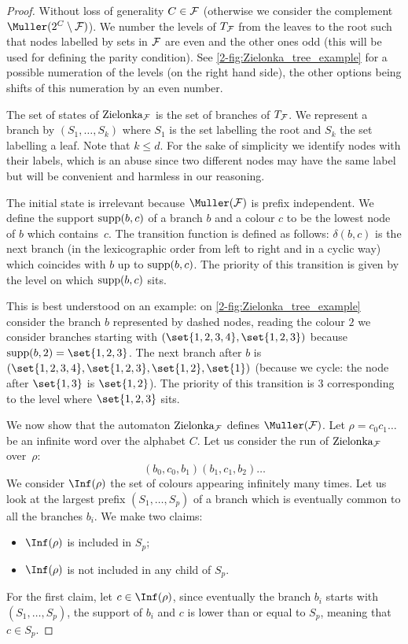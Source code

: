 \begin{proof}
Without loss of generality $C \in \mathcal{F}$ (otherwise we consider the complement $\Muller(2^C \setminus \F)$).
We number the levels of $T_{\mathcal{F}}$ from the leaves to the root such that nodes labelled by sets in $\mathcal{F}$ are even
and the other ones odd (this will be used for defining the parity condition).
See \cref{2-fig:Zielonka_tree_example} for a possible numeration of the levels (on the right hand side), the other options being shifts of this numeration by an even number.

The set of states of $\mathrm{Zielonka}_{\mathcal{F}}$ is the set of branches of $T_{\mathcal{F}}$.
We represent a branch by $(S_1,\dots,S_k)$
where $S_1$ is the set labelling the root and $S_k$ the set labelling a leaf. Note that $k \le d$.
For the sake of simplicity we identify nodes with their labels, which is an abuse since two different nodes may have the same label
but will be convenient and harmless in our reasoning.

The initial state is irrelevant because $\Muller(\F)$ is prefix independent.
We define the support $\mathrm{supp}(b,c)$ of a branch $b$ and a colour $c$ to be the lowest node of $b$ which contains~$c$.
The transition function is defined as follows: 
$\delta(b,c)$ is the next branch (in the lexicographic order from left to right and in a cyclic way) which coincides with $b$ up to $\mathrm{supp}(b,c)$.
The priority of this transition is given by the level on which $\mathrm{supp}(b,c)$ sits.

This is best understood on an example: on \cref{2-fig:Zielonka_tree_example}
consider the branch $b$ represented by dashed nodes, reading the colour $2$ we consider branches starting with $(\set{1,2,3,4}, \set{1,2,3})$
because $\support(b,2) = \set{1,2,3}$.
The next branch after $b$ is $(\set{1,2,3,4}, \set{1,2,3},\set{1,2},\set{1})$ (because we cycle: the node after $\set{1,3}$ is $\set{1,2}$).
The priority of this transition is $3$ corresponding to the level where $\set{1,2,3}$ sits.

We now show that the automaton $\mathrm{Zielonka}_{\mathcal{F}}$ defines $\Muller(\F)$.
Let $\rho = c_0 c_1 \dots$ be an infinite word over the alphabet $C$.
Let us consider the run of $\mathrm{Zielonka}_{\mathcal{F}}$ over~$\rho$:
\[
(b_0,c_0,b_1) (b_1,c_1,b_2) \dots
\]
We consider $\Inf(\rho)$ the set of colours appearing infinitely many times.
Let us look at the largest prefix $(S_1,\dots,S_p)$ of a branch which is eventually common to all the branches $b_i$.
We make two claims:
\begin{itemize}
	\item $\Inf(\rho)$ is included in $S_p$;
	\item $\Inf(\rho)$ is not included in any child of $S_p$.
\end{itemize}
For the first claim, let $c \in \Inf(\rho)$, since eventually the branch $b_i$ starts with $(S_1,\dots,S_p)$,
the support of $b_i$ and $c$ is lower than or equal to $S_p$, meaning that $c \in S_p$.


\end{proof}
